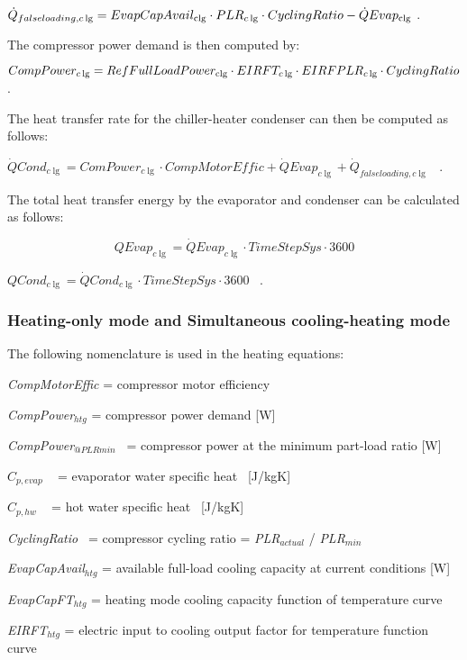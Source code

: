 \({\dot Q_{falseloading,c\lg }} = EvapCapAvai{l_{{\rm{clg}}}} \cdot PL{R_{c\lg }} \cdot CyclingRatio - \dot QEva{p_{{\rm{clg}}}}\) .

The compressor power demand is then computed by:

\(CompPowe{r_{c\lg }} = RefFullLoadPowe{r_{{\rm{clg}}}} \cdot {\rm{ }}EIRF{T_{c\lg }}{\rm{ }} \cdot EIRFPL{R_{c\lg }} \cdot CyclingRatio\) .

The heat transfer rate for the chiller-heater condenser can then be computed as follows:

\(\dot QCon{d_{c\lg }} = ComPowe{r_{c\lg }} \cdot CompMotorEffic + \dot QEva{p_{c\lg }} + {\dot Q_{falseloading,c\lg }}\) ~.

The total heat transfer energy by the evaporator and condenser can be calculated as follows:

\begin{equation}
QEva{p_{c\lg }} = \dot QEva{p_{c\lg }} \cdot TimeStepSys \cdot 3600
\end{equation}

\(QCon{d_{c\lg }} = \dot QCon{d_{c\lg }} \cdot TimeStepSys \cdot 3600\) ~.

\subsubsection{Heating-only mode and Simultaneous cooling-heating mode}\label{heating-only-mode-and-simultaneous-cooling-heating-mode}

The following nomenclature is used in the heating equations:

\emph{CompMotorEffic} = compressor motor efficiency

\emph{CompPower\(_{htg}\)} = compressor power demand {[}W{]}

\emph{CompPower\(_{@PLRmin}\)}~ = compressor power at the minimum part-load ratio {[}W{]}

\({C_{p,evap}}\) ~ = evaporator water specific heat~ {[}J/kgK{]}

\({C_{p,hw}}\) ~ = hot water specific heat~ {[}J/kgK{]}

\emph{CyclingRatio}~ = compressor cycling ratio = \emph{PLR\(_{actual}\)} / \emph{PLR\(_{min}\)}

\emph{EvapCapAvail\(_{htg}\)} = available full-load cooling capacity at current conditions {[}W{]}

\emph{EvapCapFT\(_{htg}\)} = heating mode cooling capacity function of temperature curve

\emph{EIRFT\(_{htg}\)} = electric input to cooling output factor for temperature function curve

